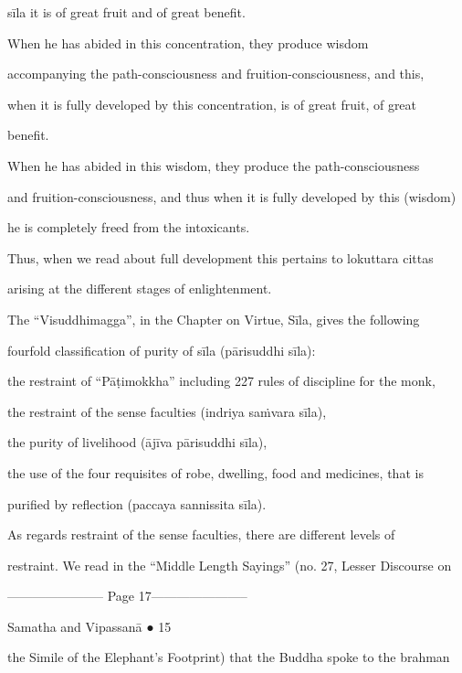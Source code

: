       sīla it is of great fruit and of great benefit.  

         When he has abided in this concentration, they produce wisdom  

      accompanying the path-consciousness and fruition-consciousness, and this,  

      when it is fully developed by this concentration, is of great fruit, of great  

      benefit.  

         When he has abided in this wisdom, they produce the path-consciousness  

      and fruition-consciousness, and thus when it is fully developed by this (wisdom)  

      he is completely freed from the intoxicants. 



Thus, when we  read  about  full  development  this  pertains  to  lokuttara  cittas  

arising at the different stages of enlightenment. 



The   “Visuddhimagga”,   in   the   Chapter   on   Virtue,   Sīla,   gives   the   following  

fourfold classification of purity of sīla  (pārisuddhi sīla): 



      the restraint of “Pāṭimokkha” including 227 rules of discipline for the monk, 

      the restraint of the sense faculties (indriya saṁvara sīla), 

      the purity of livelihood (ājīva pārisuddhi sīla), 

      the use of the four requisites of robe, dwelling, food and medicines, that is  

      purified by reflection (paccaya sannissita sīla). 



As   regards   restraint   of   the   sense   faculties,   there   are   different   levels   of  

restraint. We read in the “Middle Length Sayings”  (no. 27, Lesser Discourse on  


----------------------- Page 17-----------------------

                                                            Samatha and Vipassanā ● 15 



the Simile of the Elephant’s Footprint) that the Buddha spoke to the brahman  


